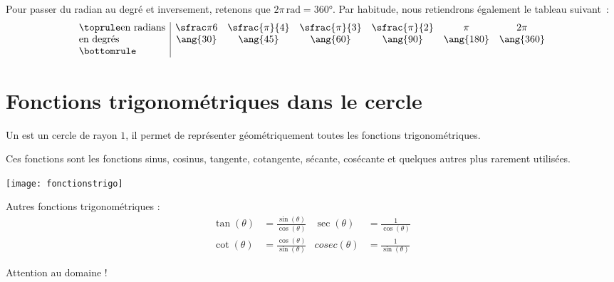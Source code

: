 \begin{frame}
  Pour passer du radian au degré et inversement, retenons que $2\pi\,\si{\radian} = \ang{360}$. Par habitude, nous retiendrons également le tableau suivant~:
  \begin{equation*}
    \begin{array}{l|cccccc}\toprule
      \text{en radians} & \sfrac \pi 6 & \sfrac{\pi}{4} & \sfrac{\pi}{3} & \sfrac{\pi}{2}& \pi & 2 \pi\\
      \text{en degrés} & \ang{30} & \ang{45} & \ang{60} & \ang{90} & \ang{180} & \ang{360}\\\bottomrule
    \end{array}
  \end{equation*}
\end{frame}

\section{Fonctions trigonométriques dans le cercle}
\label{sec:cercletrigono}\label{sec:fonctiontrigono}

\begin{frame}
  \begin{definition}
    Un  est un cercle de rayon $1$, il permet de représenter géométriquement toutes les fonctions trigonométriques.

    Ces fonctions sont les fonctions sinus, cosinus, tangente, cotangente, sécante, cosécante et quelques autres plus rarement utilisées.
  \end{definition}

\begin{center}
  \texttt{[image: fonctionstrigo]}
\end{center}
\end{frame}

\begin{frame}
  Autres fonctions trigonométriques :
  \begin{align*}
    \tan(\theta) &= \frac{\sin(\theta)}{\cos(\theta)} & \sec(\theta) &= \frac{1}{\cos(\theta)}\\
    \cot(\theta) &= \frac{\cos(\theta)}{\sin(\theta)} & cosec(\theta) &= \frac{1}{\sin(\theta)}
  \end{align*}

  Attention au domaine !
\end{frame}

